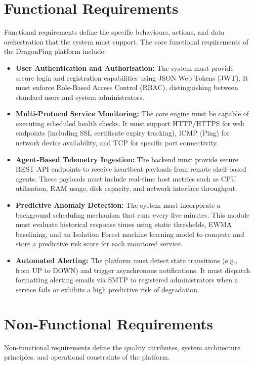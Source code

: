 \documentclass[12pt,a4paper,oneside]{report}
\begin{document}
\section{Functional Requirements}
\noindent Functional requirements define the specific behaviours, actions, and data orchestration that the system must support. The core functional requirements of the DragonPing platform include:

\begin{itemize}[label=\textbullet, leftmargin=*]
    \item \textbf{User Authentication and Authorisation:} The system must provide secure login and registration capabilities using JSON Web Tokens (JWT). It must enforce Role-Based Access Control (RBAC), distinguishing between standard users and system administrators.
    \item \textbf{Multi-Protocol Service Monitoring:} The core engine must be capable of executing scheduled health checks. It must support HTTP/HTTPS for web endpoints (including SSL certificate expiry tracking), ICMP (Ping) for network device availability, and TCP for specific port connectivity.
    \item \textbf{Agent-Based Telemetry Ingestion:} The backend must provide secure REST API endpoints to receive heartbeat payloads from remote shell-based agents. These payloads must include real-time host metrics such as CPU utilisation, RAM usage, disk capacity, and network interface throughput.
    \item \textbf{Predictive Anomaly Detection:} The system must incorporate a background scheduling mechanism that runs every five minutes. This module must evaluate historical response times using static thresholds, EWMA baselining, and an Isolation Forest machine learning model to compute and store a predictive risk score for each monitored service.
    \item \textbf{Automated Alerting:} The platform must detect state transitions (e.g., from UP to DOWN) and trigger asynchronous notifications. It must dispatch formatting alerting emails via SMTP to registered administrators when a service fails or exhibits a high predictive risk of degradation.
\end{itemize}

\section{Non-Functional Requirements}
\noindent Non-functional requirements define the quality attributes, system architecture principles, and operational constraints of the platform.
\end{document}
